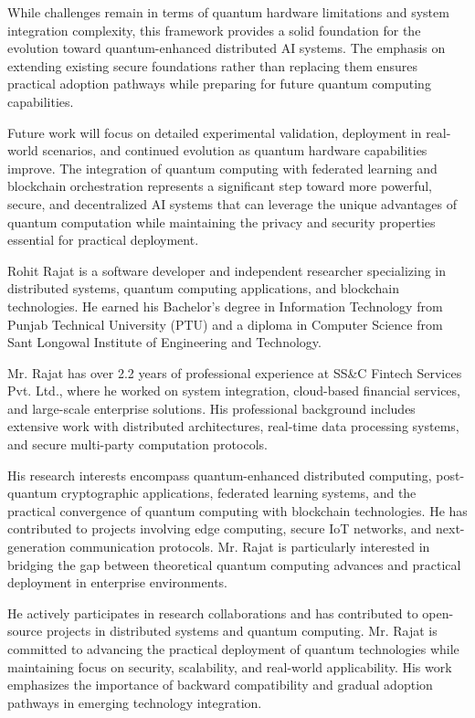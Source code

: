 \documentclass[10pt,journal,compsoc]{IEEEtran}
\begin{document}
While challenges remain in terms of quantum hardware limitations and system integration complexity, this framework provides a solid foundation for the evolution toward quantum-enhanced distributed AI systems. The emphasis on extending existing secure foundations rather than replacing them ensures practical adoption pathways while preparing for future quantum computing capabilities.

Future work will focus on detailed experimental validation, deployment in real-world scenarios, and continued evolution as quantum hardware capabilities improve. The integration of quantum computing with federated learning and blockchain orchestration represents a significant step toward more powerful, secure, and decentralized AI systems that can leverage the unique advantages of quantum computation while maintaining the privacy and security properties essential for practical deployment.

\begin{IEEEbiography}{Rohit Rajat}
is a software developer and independent researcher specializing in distributed systems, quantum computing applications, and blockchain technologies. He earned his Bachelor's degree in Information Technology from Punjab Technical University (PTU) and a diploma in Computer Science from Sant Longowal Institute of Engineering and Technology.

Mr. Rajat has over 2.2 years of professional experience at SS\&C Fintech Services Pvt. Ltd., where he worked on system integration, cloud-based financial services, and large-scale enterprise solutions. His professional background includes extensive work with distributed architectures, real-time data processing systems, and secure multi-party computation protocols.

His research interests encompass quantum-enhanced distributed computing, post-quantum cryptographic applications, federated learning systems, and the practical convergence of quantum computing with blockchain technologies. He has contributed to projects involving edge computing, secure IoT networks, and next-generation communication protocols. Mr. Rajat is particularly interested in bridging the gap between theoretical quantum computing advances and practical deployment in enterprise environments.

He actively participates in research collaborations and has contributed to open-source projects in distributed systems and quantum computing. Mr. Rajat is committed to advancing the practical deployment of quantum technologies while maintaining focus on security, scalability, and real-world applicability. His work emphasizes the importance of backward compatibility and gradual adoption pathways in emerging technology integration.
\end{IEEEbiography}
\end{document}
